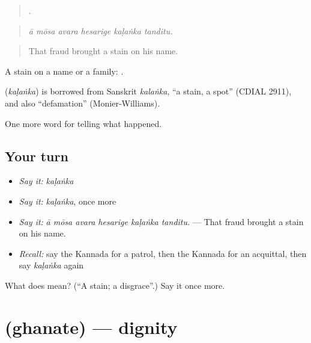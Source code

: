 \begin{quote}
     .
\end{quote}

\begin{quote}
\emph{ā mōsa avara hesarige kaḷaṅka tanditu.}
\end{quote}

\begin{quote}
That fraud brought a stain on his name.
\end{quote}

A stain on a name or a family:  .

\begin{cousinweb}
\textbf{} (\emph{kaḷaṅka}) is borrowed from Sanskrit \emph{kalaṅka}, \textquotedblleft{}a stain, a spot\textquotedblright{} (CDIAL 2911), and also \textquotedblleft{}defamation\textquotedblright{} (Monier-Williams).
\end{cousinweb}

\begin{grammarlens}[title={What you've built}]
One more word for telling what happened.
\end{grammarlens}

\subsection*{Your turn}
\begin{itemize}
\raggedright
  \item \emph{Say it:} \emph{kaḷaṅka}
  \item \emph{Say it:} \emph{kaḷaṅka}, once more
  \item \emph{Say it:} \emph{ā mōsa avara hesarige kaḷaṅka tanditu.} — That fraud brought a stain on his name.
  \item \emph{Recall:} say the Kannada for a patrol, then the Kannada for an acquittal, then say \emph{kaḷaṅka} again
\end{itemize}

\begin{tcolorbox}[breakable,colback=teal!4,colframe=teal!35!black,title={Before you move on}]
What does  mean? (\textquotedblleft{}A stain; a disgrace\textquotedblright{}.) Say it once more.
\end{tcolorbox}
\section[\texorpdfstring{\kn{ಘನತೆ} (ghanate)}{ಘನತೆ (ghanate)}]{ (ghanate) — dignity}

